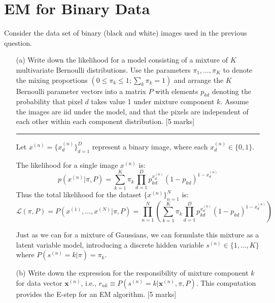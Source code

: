 \documentclass{article}
\begin{document}
\section{EM for Binary Data}

Consider the data set of binary (black and white) images used in the previous question.

\begin{enumerate}

    \item[(a)] Write down the likelihood for a model consisting of a mixture of \( K \) multivariate Bernoulli distributions. Use the parameters \(\pi_1, \dots, \pi_K\) to denote the mixing proportions \((0 \leq \pi_k \leq 1; \sum_k \pi_k = 1)\) and arrange the \(K\) Bernoulli parameter vectors into a matrix \( P \) with elements \( p_{kd} \) denoting the probability that pixel \( d \) takes value 1 under mixture component \( k \). Assume the images are iid under the model, and that the pixels are independent of each other within each component distribution. [5 marks]

    \noindent\textcolor{gray}{\rule{0.1\linewidth}{0.4pt}}
    \vspace{10pt}

    Let \( x^{(n)} = \{ x^{(n)}_d \}_{d=1}^D \) represent a binary image, where each \( x^{(n)}_d \in \{0, 1\} \).
    \vspace{5pt}

    The likelihood for a single image \( x^{(n)} \) is:
    \begin{equation}
    p(x^{(n)} | \pi, P) = \sum_{k=1}^K \pi_k \prod_{d=1}^D p_{kd}^{x^{(n)}_d} (1 - p_{kd})^{1 - x^{(n)}_d}
    \end{equation}
    Thus the total likelihood for the dataset \( \{ x^{(n)} \}_{n=1}^N \) is:
    \begin{equation}
    \boxed{\mathcal{L}(\pi, P) = P(x^{(1)}, \dots, x^{(N)} | \pi, P) = \prod_{n=1}^N \left( \sum_{k=1}^K \pi_k \prod_{d=1}^D p_{kd}^{x^{(n)}_d} (1 - p_{kd})^{1 - x^{(n)}_d} \right)}
    \end{equation}

    \vspace{10pt}


    Just as we can for a mixture of Gaussians, we can formulate this mixture as a latent variable model, introducing a discrete hidden variable \( s^{(n)} \in \{1, \dots, K\} \) where \( P(s^{(n)} = k | \pi) = \pi_k \).

    \item[(b)] Write down the expression for the responsibility of mixture component \( k \) for data vector \( \mathbf{x}^{(n)} \), i.e., \( r_{nk} \equiv P(s^{(n)} = k | \mathbf{x}^{(n)}, \pi, P) \). This computation provides the E-step for an EM algorithm. [5 marks]


\end{enumerate}
\end{document}
